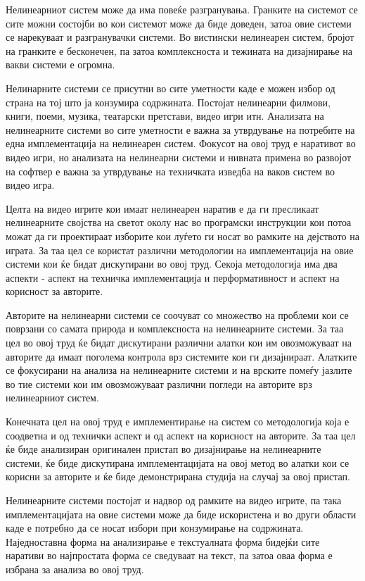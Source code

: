 Нелинеарниот систем може да има повеќе разгранувања. Гранките на системот се сите можни состојби во кои системот може да биде доведен, затоа овие системи се нарекуваат и разгранувачки системи. Во вистински нелинеарен систем, бројот на гранките е бесконечен, па затоа комплексноста и тежината на дизајнирање на вакви системи е огромна.

Нелинарните системи се присутни во сите уметности каде е можен избор од страна на тој што ја конзумира содржината. Постојат нелинеарни филмови, книги, поеми, музика, театарски претстави, видео игри итн. Анализата на нелинеарните системи во сите уметности е важна за утврдување на потребите на една имплементација на нелинеарен систем. Фокусот на овој труд е наративот во видео игри, но анализата на нелинеарни системи и нивната примена во развојот на софтвер е важна за утврдување на техничката изведба на ваков систем во видео игра.

Целта на видео игрите кои имаат нелинеарен наратив е да ги пресликаат нелинеарните својства на светот околу нас во програмски инструкции кои потоа можат да ги проектираат изборите кои луѓето ги носат во рамките на дејството на играта. За таа цел се користат различни методологии на имплементација на овие системи кои ќе бидат дискутирани во овој труд. Секоја методологија има два аспекти - аспект на техничка имплементација и перформативност и аспект на корисност за авторите.

Авторите на нелинеарни системи се соочуват со множество на проблеми кои се поврзани со самата природа и комплексноста на нелинеарните системи. За таа цел во овој труд ќе бидат дискутирани различни алатки кои им овозможуваат на авторите да имаат поголема контрола врз системите кои ги дизајнираат. Алатките се фокусирани на анализа на нелинеарните системи и на врските помеѓу јазлите во тие системи кои им овозможуваат различни погледи на авторите врз нелинеарниот систем.

Конечната цел на овој труд е имплементирање на систем со методологија која е соодветна и од технички аспект и од аспект на корисност на авторите. За таа цел ќе биде анализиран оригинален пристап во дизајнирање на нелинеарните системи, ќе биде дискутирана имплементацијата на овој метод во алатки кои се корисни за авторите и ќе биде демонстрирана студија на случај за овој пристап.

Нелинеарните системи постојат и надвор од рамките на видео игрите, па така имплементацијата на овие системи може да биде искористена и во други области каде е потребно да се носат избори при конзумирање на содржината. Наједноставна форма на анализирање е текстуалната форма бидејќи сите наративи во најпростата форма се сведуваат на текст, па затоа оваа форма е избрана за анализа во овој труд.

